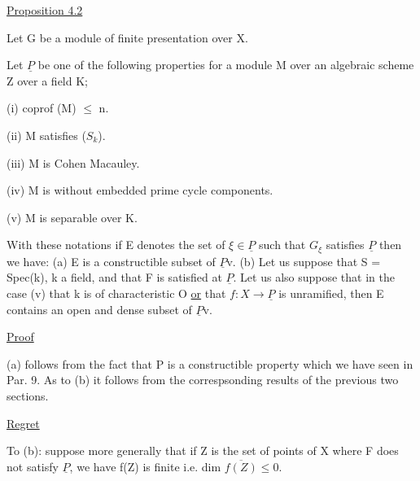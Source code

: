 
\uline{Proposition 4.2}

Let G be a module of finite presentation over X.

Let $\underline{P}$ be one of the following properties for a module M over
an algebraic scheme Z over a field K;

(i) coprof (M) $\leq$ n.

(ii) M satisfies ($S_k$).

(iii) M is Cohen Macauley.

(iv) M is without embedded prime cycle components.

(v) M is separable over K.

With these notations if E denotes the set of $\xi \in \underline{P}$ such that $G_\xi$
satisfies $\underline{P}$ then we have: (a) E is a constructible subset of $\underline{P}$v.
(b) Let us suppose that S = Spec(k), k a field, and that F is
satisfied at $\underline{P}$. Let us also suppose that in the case (v) that k
is of characteristic O \uline{or} that $f\colon X \to \underline{P}$ is unramified, then E
contains an open and dense subset of $\underline{P}$v.

\uline{Proof}

(a) follows from the fact that P is a constructible property
which we have seen in Par. 9. As to (b) it follows from the
correspsonding results of the previous two sections.

\uline{Regret}

To (b): suppose more generally that if Z is the set of
points of X where F does not satisfy $\underline{P}$, we have f(Z) is finite
i.e. dim $\overline{f(Z)} \leq 0$.
